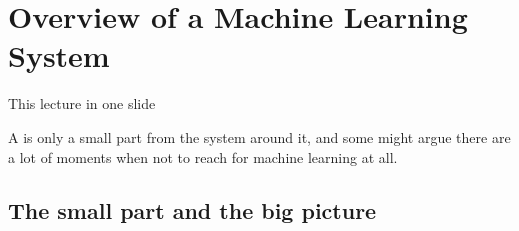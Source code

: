 
\section[Overview]{Overview of a Machine Learning System}


\begin{frame}{This lecture in one slide}
  \begin{withmargin}
    \begin{tdmain}
    \end{tdmain}
    \begin{tdmargin}
      A  is only a small part from the system around it, and some might argue there are a lot of moments when not to
reach for machine learning at all.
    \end{tdmargin}
  \end{withmargin}
\end{frame}

\subsection{The small part and the big picture}

